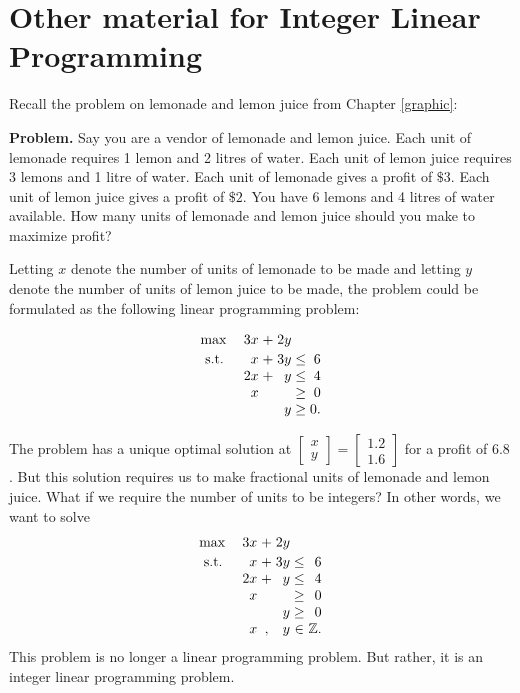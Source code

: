 %

\section{Other material for Integer Linear Programming}\label{integer-linear-programming}

Recall the problem on lemonade and lemon juice from Chapter
\ref{graphic}:

\textbf{Problem.} Say you are a vendor of lemonade and lemon juice. Each
unit of lemonade requires 1 lemon and 2 litres of water. Each unit of
lemon juice requires 3 lemons and 1 litre of water. Each unit of
lemonade gives a profit of \(\$ 3\). Each unit of lemon juice gives a
profit of \(\$ 2\). You have 6 lemons and 4 litres of water available.
How many units of lemonade and lemon juice should you make to maximize
profit?

Letting \(x\) denote the number of units of lemonade to be made and
letting \(y\) denote the number of units of lemon juice to be made, the
problem could be formulated as the following linear programming problem:

\[
\begin{array}{l r@{\;}c@{\;}r@{\;}c@{\;}r}
\max & 3x & + & 2y &      &   \\[2pt]
\st  & x  & + & 3y & \leq & 6 \\
     & 2x & + & y  & \leq & 4 \\
     & x  &   &    & \geq & 0 \\
     &    &   & y  & \geq & 0.
\end{array}
\]

The problem has a unique optimal solution at
\(\begin{bmatrix} x \\ y\end{bmatrix} = \begin{bmatrix} 1.2 \\ 1.6\end{bmatrix}\)
for a profit of \(6.8\). But this solution requires us to make
fractional units of lemonade and lemon juice. What if we require the
number of units to be integers? In other words, we want to solve
\[
\begin{array}{l r@{\;}c@{\;}r@{\;}c@{\;}r}
\max & 3x & + & 2y &      &   \\[2pt]
\st  & x  & + & 3y & \leq & 6 \\
     & 2x & + & y  & \leq & 4 \\
     & x  &   &    & \geq & 0 \\
     &    &   & y  & \geq & 0 \\
     & x  & , & y  & \in  & \mathbb{Z}.
\end{array}
\] This problem is no longer a linear programming problem.
But rather, it is an integer linear programming problem.

